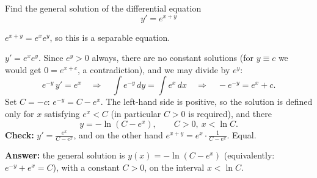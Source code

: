 
\begin{question}
Find the general solution of the differential equation
\[ y' = e^{x+y} \]
\end{question}

\begin{hint}
$e^{x+y} = e^x e^y$, so this is a separable equation.
\end{hint}

\begin{solution}
$y' = e^x e^y$. Since $e^y > 0$ always, there are no constant solutions (for $y\equiv c$ we would get $0 = e^{x+c}$, a contradiction), and we may divide by $e^y$:
\[ e^{-y}\,y' = e^x \quad\Longrightarrow\quad \int e^{-y}\,dy = \int e^x\,dx \quad\Longrightarrow\quad -e^{-y} = e^x + c. \]
Set $C = -c$: $e^{-y} = C - e^x$. The left-hand side is positive, so the solution is defined only for $x$ satisfying $e^x < C$ (in particular $C > 0$ is required), and there
\[ y = -\ln\left(C - e^x\right), \qquad C > 0,\ x < \ln C. \]
\textbf{Check:} $y' = \frac{e^x}{C - e^x}$, and on the other hand $e^{x+y} = e^x\cdot\frac{1}{C - e^x}$. Equal.

\textbf{Answer:} the general solution is $y(x) = -\ln(C - e^x)$ (equivalently: $e^{-y} + e^x = C$), with a constant $C>0$, on the interval $x < \ln C$.
\end{solution}

